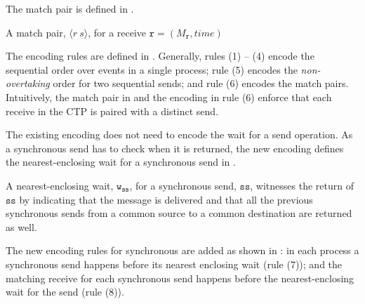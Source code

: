 The match pair is defined in .
\begin{definition}
A match pair, $\langle r\ s\rangle$, for a receive $\mathtt{r}=(M_\mathtt{r},\mathit{time})$
\label{def:mp}
\end{definition}

The encoding rules are defined in \figref{}. Generally, rules (1) -- (4) encode the sequential order over events in a single process; rule (5) encodes the \emph{non-overtaking} order for two sequential sends; and rule (6) encodes the match pairs. Intuitively, the match pair in  and the encoding in rule (6) enforce that each receive in the CTP is paired with a distinct send. 

\encodingptp

The existing encoding does not need to encode the wait for a send operation. As a synchronous send has to check when it is returned, the new encoding defines the nearest-enclosing wait for a synchronous send in .

\begin{definition}
A nearest-enclosing wait, $\mathtt{w}_\mathtt{ss}$, for a synchronous send, $\mathtt{ss}$, witnesses the return of $\mathtt{ss}$ by indicating that the message is delivered and that all the previous synchronous sends from a common source to a common destination are returned as well.
\end{definition}

The new encoding rules for synchronous are added as shown in : in each process a synchronous send happens before its nearest enclosing wait (rule (7)); and the matching receive for each synchronous send happens before the nearest-enclosing wait for the send (rule (8)).

\encodingsync







